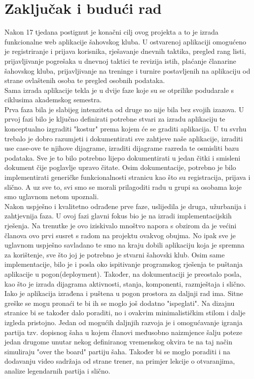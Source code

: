 \documentclass{article}
\begin{document}
	\section{Zaključak i budući rad}
	Nakon 17 tjedana postignut je konačni cilj ovog projekta a to je izrada funkcionalne web aplikacije šahovskog kluba. U ostvarenoj aplikaciji omogućeno je registriranje i prijava korisnika, rješavanje dnevnih taktika, pregled rang listi, prijavljivanje pogrešaka u dnevnoj taktici te revizija istih, plaćanje članarine šahovskog kluba, prijavljivanje na treninge i turnire postavljenih na aplikaciju od strane ovlaštenih osoba te pregled osobnih podataka.\\
	Sama izrada aplikacije tekla je u dvije faze koje su se otprilike podudarale s ciklusima akademskog semestra.\\
	Prva faza bila je slabijeg intenziteta od druge no nije bila bez svojih izazova. U prvoj fazi bilo je ključno definirati potrebne stvari za izradu aplikaciju te konceptualno izgraditi "kostur" prema kojem će se graditi aplikacija. U tu svrhu trebalo je dobro razumjeti i dokumentirati sve zahtjeve naše aplikacije, izraditi use case-ove te njihove dijagrame, izraditi dijagrame razreda te osmisliti bazu podataka. Sve je to bilo potrebno lijepo dokumentirati u jedan čitki i smisleni dokument čije poglavlje upravo čitate. Osim dokumentacije, potrebno je bilo implementirati generičke funkcionalnosti stranicu kao što su registracija, prijava i slično. A uz sve to, svi smo se morali prilagoditi radu u grupi sa osobama koje smo uglavnom netom upoznali. \\
	Nakon uspješno i kvalitetno odrađene prve faze, uslijedila je druga, užurbanija i zahtjevnija faza. U ovoj fazi glavni fokus bio je na izradi implementacijskih rješenja. Na trenutke je ovo iziskivalo mnoštvo napora s obzirom da je većini članova ovo prvi susret s radom na projektu ovakvog obujma. No ipak sve je uglavnom uspješno savladano te smo na kraju dobili aplikaciju koja je spremna za korištenje, sve što joj je potrebno je stvarni šahovski klub. Osim same implementacije, bilo je i posla oko ispitivanje programskog rješenja te puštanja aplikacije u pogon(deployment). Također, na dokumentaciji je preostalo posla, kao što je izrada dijagrama aktivnosti, stanja, komponenti, razmještaja i slično.\\
	Iako je aplikacija izrađena i puštena u pogon prostora za daljnji rad ima. Sitne greške se mogu pronaći te bi ih se moglo još dodatno "ispeglati". Na dizajnu stranice bi se također dalo poraditi, no i ovakvim minimalističkim stilom i dalje izgleda pristojno. Jedan od mogućih daljnjih razvoja je i omogućavanje igranja partija tzv. dopisnog šaha u kojem članovi međusobno naizmjence šalju poteze jedan drugome unutar nekog definiranog vremenskog okvira te na taj način simuliraju "over the board" partiju šaha. Također bi se moglo poraditi i na dodavanju video sadržaja od strane trener, na primjer lekcije o otvaranjima, analize legendarnih partija i slično.\\
\end{document}
